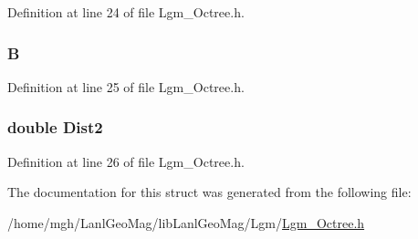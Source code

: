 Definition at line 24 of file Lgm\_\-Octree.h.\hypertarget{struct___lgm___octree_data_867ec249dee38c139df965aa1611ed2a}{
\subsubsection[{B}]{ {\bf B}}}
\label{struct___lgm___octree_data_867ec249dee38c139df965aa1611ed2a}




Definition at line 25 of file Lgm\_\-Octree.h.\hypertarget{struct___lgm___octree_data_527416adf36035c3ea5799827e7cd8b9}{
\subsubsection[{Dist2}]{\setlength{\rightskip}{0pt plus 5cm}double {\bf Dist2}}}
\label{struct___lgm___octree_data_527416adf36035c3ea5799827e7cd8b9}




Definition at line 26 of file Lgm\_\-Octree.h.

The documentation for this struct was generated from the following file:\begin{CompactItemize}
\item 
/home/mgh/LanlGeoMag/libLanlGeoMag/Lgm/\hyperlink{_lgm___octree_8h}{Lgm\_\-Octree.h}\end{CompactItemize}
